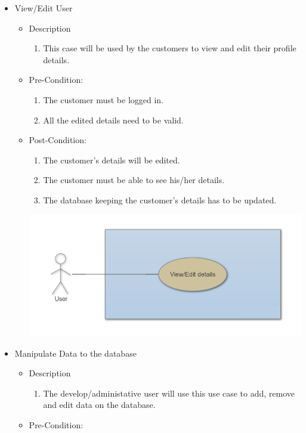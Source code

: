 \documentclass[a4paper,10pt]{article}
\begin{document}
\begin{enumerate}
\begin{itemize}
					\item View/Edit User
					\begin{itemize}
						\item Description
							\begin{enumerate}
								\item This case will be used by the customers to view and edit their profile details.
							\end{enumerate}
						\item Pre-Condition:
							\begin{enumerate}	
								\item The customer must be logged in.
								\item All the edited details need to be valid.
							\end{enumerate}
						\item Post-Condition:
							\begin{enumerate}
								\item The customer's details will be edited.
								\item The customer must be able to see his/her details.
								\item The database keeping the customer's details has to be updated.
							\end{enumerate}
		 \includegraphics[scale=0.62]{Diagrams/View_EditUseCase.png}\\
					\end{itemize}
				\item Manipulate Data to the database
				\begin{itemize}
					\item Description
						\begin{enumerate}
							\item The develop/administative user will use this use case to add, remove and edit data on the database. 
						\end{enumerate}
					\item Pre-Condition:

\end{itemize}
\end{itemize}
\end{enumerate}
\end{document}
